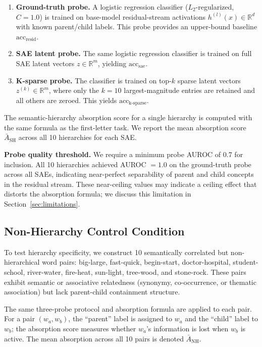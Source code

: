 \documentclass{article}
\begin{document}
\begin{enumerate}
\item \textbf{Ground-truth probe.} A logistic regression classifier ($L_2$-regularized, $C = 1.0$) is trained on base-model residual-stream activations $h^{(l)}(x) \in \mathbb{R}^d$ with known parent/child labels. This probe provides an upper-bound baseline $\text{acc}_{\text{resid}}$.
\item \textbf{SAE latent probe.} The same logistic regression classifier is trained on full SAE latent vectors $z \in \mathbb{R}^m$, yielding $\text{acc}_{\text{sae}}$.
\item \textbf{K-sparse probe.} The classifier is trained on top-$k$ sparse latent vectors $z^{(k)} \in \mathbb{R}^m$, where only the $k = 10$ largest-magnitude entries are retained and all others are zeroed. This yields $\text{acc}_{\text{k-sparse}}$.
\end{enumerate}

The semantic-hierarchy absorption score for a single hierarchy is computed with the same formula as the first-letter task. We report the mean absorption score $\bar{A}_{\text{SH}}$ across all 10 hierarchies for each SAE.

\textbf{Probe quality threshold.} We require a minimum probe AUROC of 0.7 for inclusion. All 10 hierarchies achieved AUROC $= 1.0$ on the ground-truth probe across all SAEs, indicating near-perfect separability of parent and child concepts in the residual stream. These near-ceiling values may indicate a ceiling effect that distorts the absorption formula; we discuss this limitation in Section~\ref{sec:limitations}.

\subsection{Non-Hierarchy Control Condition}

To test hierarchy specificity, we construct 10 semantically correlated but non-hierarchical word pairs: big-large, fast-quick, begin-start, doctor-hospital, student-school, river-water, fire-heat, sun-light, tree-wood, and stone-rock. These pairs exhibit semantic or associative relatedness (synonymy, co-occurrence, or thematic association) but lack parent-child containment structure.

The same three-probe protocol and absorption formula are applied to each pair. For a pair $(w_a, w_b)$, the ``parent'' label is assigned to $w_a$ and the ``child'' label to $w_b$; the absorption score measures whether $w_a$'s information is lost when $w_b$ is active. The mean absorption across all 10 pairs is denoted $\bar{A}_{\text{NH}}$.
\end{document}
